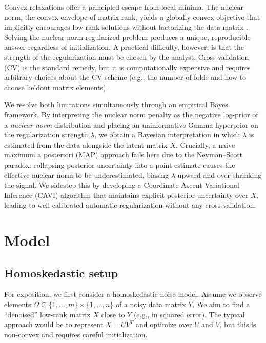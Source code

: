 \documentclass[11pt]{article}
\begin{document}
Convex relaxations offer a principled escape from local minima. The nuclear norm, the convex envelope of matrix rank, yields a globally convex objective that implicitly encourages low-rank solutions without factorizing the data matrix \citep{recht2010guaranteed, candes2010power}. Solving the nuclear-norm-regularized problem produces a unique, reproducible answer regardless of initialization. A practical difficulty, however, is that the strength of the regularization must be chosen by the analyst. Cross-validation (CV) is the standard remedy, but it is computationally expensive and requires arbitrary choices about the CV scheme (e.g., the number of folds and how to choose heldout matrix elements). 

We resolve both limitations simultaneously through an empirical Bayes framework. By interpreting the nuclear norm penalty as the negative log-prior of a \emph{nuclear norm} distribution and placing an uninformative Gamma hyperprior on the regularization strength $\lambda$, we obtain a Bayesian interpretation in which $\lambda$ is estimated from the data alongside the latent matrix $X$. Crucially, a naive maximum a posteriori (MAP) approach fails here due to the Neyman–Scott paradox: collapsing posterior uncertainty into a point estimate causes the effective nuclear norm to be underestimated, biasing $\lambda$ upward and over-shrinking the signal. We sidestep this by developing a Coordinate Ascent Variational Inference (CAVI) algorithm that maintains explicit posterior uncertainty over $X$, leading to well-calibrated automatic regularization without any cross-validation.

\section{Model}

\subsection{Homoskedastic setup}

For exposition, we first consider a homoskedastic noise model. Assume we observe elements $\Omega \subseteq \{1,\ldots,m\}\times\{1,\ldots,n\}$ of a noisy data matrix $Y$. We aim to find a ``denoised'' low-rank matrix $X$ close to $Y$ (e.g., in squared error). The typical approach would be to represent $X=UV^T$ and optimize over $U$ and $V$, but this is non-convex and requires careful initialization. 
\end{document}
